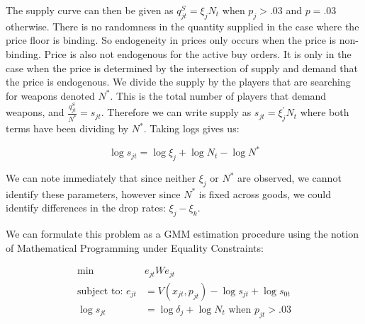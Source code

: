 \documentclass[12pt]{paper}
\begin{document}
The supply curve can then be given as $q_{jt}^S = \xi_{j} N_t$ when
$p_j > .03$ and $p = .03$ otherwise. There is no randomness in the
quantity supplied in the case where the price floor is binding. So
endogeneity in prices only occurs when the price is non-binding. Price
is also not endogenous for the active buy orders. It is only in the
case when the price is determined by the intersection of supply and
demand that the price is endogenous. We divide the supply by the
players that are searching for weapons denoted $N^{*}$. This is the
total number of players that demand weapons, and $\frac{q_{jt}^S }{N^{*}}
= s_{jt}$. Therefore we can write supply as $s_{jt} = \xi_j^{\prime} N_t$
where both terms have been dividing by $N^{*}$. Taking logs gives us:

\begin{equation*}
  \log s_{jt} = \log \xi_j + \log N_t - \log N^{*}
\end{equation*}

We can note immediately that since neither $\xi_j$ or $N^{*}$ are
observed, we cannot identify these parameters, however since $N^{*}$
is fixed across goods, we could identify differences in the drop
rates: $\xi_j - \xi_k$.

We can formulate this problem as a GMM estimation procedure using the
notion of Mathematical Programming under Equality Constraints:

\begin{align*}
  \min \quad & e_{jt} W e_{jt}\\
  \text{subject to: } e_{jt} &= V(x_{jt}, p_{jt}) - \log s_{jt} + \log
  s_{0t}\\
  \log s_{jt} &= \log \delta_j + \log N_t \text{ when } p_{jt} > .03
\end{align*}
\end{document}
